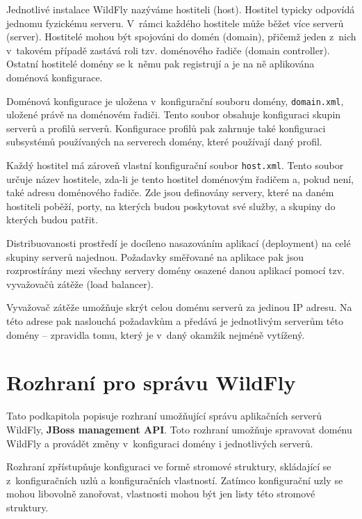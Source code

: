 Jednotlivé instalace WildFly nazýváme hostiteli (host). Hostitel typicky odpovídá jednomu fyzickému serveru.
V~rámci každého hostitele může běžet více serverů (server).
Hostitelé mohou být spojováni do domén (domain), přičemž jeden z~nich v~takovém případě zastává roli tzv. doménového řadiče (domain controller).
Ostatní hostitelé domény se k~němu pak registrují a je na ně aplikována doménová konfigurace.
\cite{jbossDomainSetup}

Doménová konfigurace je uložena v~konfigurační souboru domény, {\tt domain.xml}, uložené právě na doménovém řadiči.
Tento soubor obsahuje konfiguraci skupin serverů a profilů serverů.
Konfigurace profilů pak zahrnuje také konfiguraci subsystémů používaných na serverech domény, které používají daný profil.
\cite{jbossDomainSetup}

Každý hostitel má zároveň vlastní konfigurační soubor {\tt host.xml}.
Tento soubor určuje název hostitele, zda-li je tento hostitel doménovým řadičem a, pokud není, také adresu doménového řadiče.
Zde jsou definovány servery, které na daném hostiteli poběží, porty, na kterých budou poskytovat své služby, a skupiny do kterých budou patřit.
\cite{jbossDomainSetup}

Distribuovanosti prostředí je docíleno nasazováním aplikací (deployment) na celé skupiny serverů najednou.
Požadavky směřované na aplikace pak jsou rozprostírány mezi všechny servery domény osazené danou aplikací pomocí tzv. vyvažovačů zátěže (load balancer).
\cite{jbossLoadBalancing}

Vyvažovač zátěže umožňuje skrýt celou doménu serverů za jedinou IP adresu.
Na této adrese pak naslouchá požadavkům a předává je jednotlivým serverům této domény -- zpravidla tomu, který je v~daný okamžik nejméně vytížený.
\cite{jbossLoadBalancing}

\section{Rozhraní pro správu WildFly} \label{managementAPI}

Tato podkapitola popisuje rozhraní umožňující správu aplikačních serverů WildFly, {\bf JBoss management API}.
Toto rozhraní umožňuje spravovat doménu WildFly a provádět změny v~konfiguraci domény i jednotlivých serverů.
\cite{jbossDetypedManagement}

Rozhraní zpřístupňuje konfiguraci ve formě stromové struktury, skládající se z~konfiguračních uzlů a konfiguračních vlastností.
Zatímco konfigurační uzly se mohou libovolně zanořovat, vlastnosti mohou být jen listy této stromové struktury.
\cite{jbossDetypedManagement}

